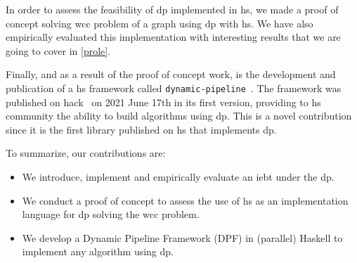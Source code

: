 In order to assess the feasibility of \acrshort{dp} implemented in \acrshort{hs}, we made a proof of concept solving \acrlong{wcc} problem of a graph using \acrshort{dp} with \acrshort{hs}. We have also empirically evaluated this implementation with interesting results that we are going to cover in \autoref{prole}. 

Finally, and as a result of the proof of concept work, is the development and publication of a \acrshort{hs} framework called \texttt{dynamic-pipeline}~\cite{dynamic-pipeline}.  The framework was published on \acrfull{hack}~\cite{hackage} on 2021 June 17th in its first version,
providing to \acrshort{hs} community the ability to build algorithms using \acrshort{dp}. This is a novel contribution since it is the first library published on \acrshort{hs} that implements \acrshort{dp}.

To summarize, our contributions are:
\begin{itemize}
  \item We introduce, implement and empirically evaluate an \acrlong{iebt} under the \acrlong{dp}.
  \item We conduct a proof of concept to assess the use of \acrlong{hs} as an implementation language for \acrlong{dp} solving the \acrlong{wcc} problem.
  \item We develop a Dynamic Pipeline Framework (DPF) in (parallel) Haskell to implement any algorithm using \acrlong{dp}.
\end{itemize}

